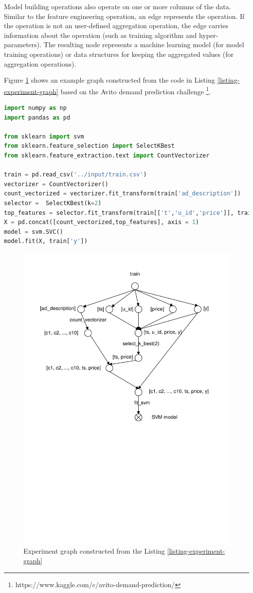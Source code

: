 Model building operations also operate on one or more columns of the data.
Similar to the feature engineering operation, an edge represents the operation.
If the operation is not an user-defined aggregation operation, the edge carries information about the operation (such as training algorithm and hyper-parameters).
The resulting node represents a machine learning model (for model training operations) or data structures for keeping the aggregated values (for aggregation operations).

Figure \ref{fig-experiment-graph} shows an example graph constructed from the code in Listing \ref{listing-experiment-graph} based on the Avito demand prediction challenge \footnote{https://www.kaggle.com/c/avito-demand-prediction/}.

\begin{lstlisting}[language=Python, caption=Example script,captionpos=b,label = {listing-experiment-graph}]
import numpy as np
import pandas as pd

from sklearn import svm
from sklearn.feature_selection import SelectKBest
from sklearn.feature_extraction.text import CountVectorizer

train = pd.read_csv('../input/train.csv')
vectorizer = CountVectorizer()
count_vectorized = vectorizer.fit_transform(train['ad_description'])
selector =  SelectKBest(k=2)
top_features = selector.fit_transform(train[['t','u_id','price']], train['y'])
X = pd.concat([count_vectorized,top_features], axis = 1)
model = svm.SVC()
model.fit(X, train['y'])
\end{lstlisting}

\begin{figure}
\centering
\includegraphics[width=\columnwidth]{../images/experiment-graph}
\caption{Experiment graph constructed from the Listing \ref{listing-experiment-graph}}
\label{fig-experiment-graph}
\end{figure}
